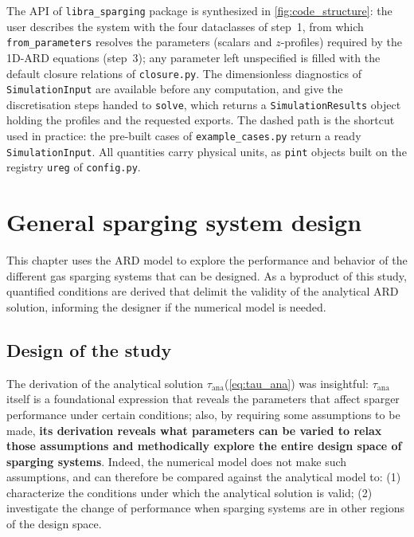 \documentclass[a4paper,11pt,oneside]{report}
\newcommand{\Tana}{\ensuremath{\tau_\mathrm{ana}}}
\newcounter{assumption}[chapter]
\begin{document}
The API of \verb|libra_sparging| package is synthesized in \cref{fig:code_structure}: the user describes the system with the four dataclasses of step~1, from which \texttt{from\_parameters} resolves the parameters (scalars and $z$-profiles) required by the 1D-ARD equations (step~3); any parameter left unspecified is filled with the default closure relations of \texttt{closure.py}. The dimensionless diagnostics of \texttt{SimulationInput} are available before any computation, and give the discretisation steps handed to \texttt{solve}, which returns a \texttt{SimulationResults} object holding the profiles and the requested exports. The dashed path is the shortcut used in practice: the pre-built cases of \texttt{example\_cases.py} return a ready \texttt{SimulationInput}. All quantities carry physical units, as \texttt{pint} objects built on the registry \texttt{ureg} of \texttt{config.py}.




\chapter{General sparging system design}
\label{sec:sparging_expl}

This chapter uses the ARD model to explore the performance and behavior of the different gas sparging systems that can be designed. As a byproduct of this study, quantified conditions are derived that delimit the validity of the analytical ARD solution, informing the designer if the numerical model is needed. 


\section{Design of the study}
The derivation of the analytical solution \Tana (\cref{eq:tau_ana}) was insightful: \Tana itself is a foundational expression that reveals the parameters that affect sparger performance under certain conditions; also, by requiring some assumptions to be made, \textbf{its derivation reveals what parameters can be varied to relax those assumptions and methodically explore the entire design space of sparging systems}. Indeed, the numerical model does not make such assumptions, and can therefore be compared against the analytical model to: (1) characterize the conditions under which the analytical solution is valid; (2) investigate the change of performance when sparging systems are in other regions of the design space. 
\end{document}

